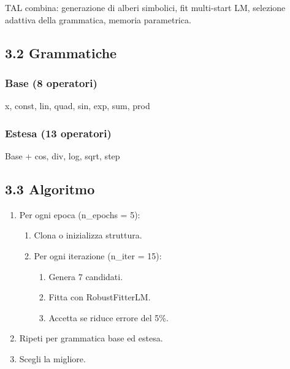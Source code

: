 \documentclass[
]{article}
\providecommand{\tightlist}{%
  \setlength{\itemsep}{0pt}\setlength{\parskip}{0pt}}
\begin{document}
TAL combina: generazione di alberi simbolici, fit multi-start LM,
selezione adattiva della grammatica, memoria parametrica.

\subsection{3.2 Grammatiche}\label{grammatiche}

\subsubsection{Base (8 operatori)}\label{base-8-operatori}

x, const, lin, quad, sin, exp, sum, prod

\subsubsection{Estesa (13 operatori)}\label{estesa-13-operatori}

Base + cos, div, log, sqrt, step

\subsection{3.3 Algoritmo}\label{algoritmo}

\begin{enumerate}
\def\labelenumi{\arabic{enumi}.}
\tightlist
\item
  Per ogni epoca (n\_epochs = 5):

  \begin{enumerate}
  \def\labelenumii{\alph{enumii}.}
  \tightlist
  \item
    Clona o inizializza struttura.
  \item
    Per ogni iterazione (n\_iter = 15):

    \begin{enumerate}
    \def\labelenumiii{\roman{enumiii}.}
    \tightlist
    \item
      Genera 7 candidati.
    \item
      Fitta con RobustFitterLM.
    \item
      Accetta se riduce errore del 5\%.
    \end{enumerate}
  \end{enumerate}
\item
  Ripeti per grammatica base ed estesa.
\item
  Scegli la migliore.
\end{enumerate}
\end{document}
